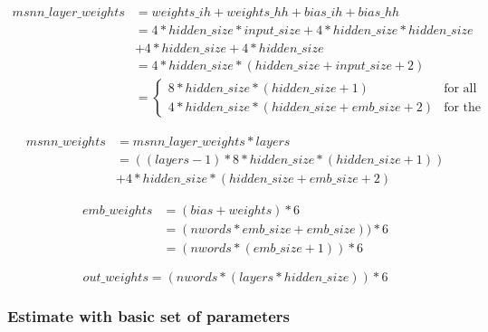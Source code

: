 \begin{equation}
\begin{aligned}
msnn\_layer\_weights &= weights\_ih + weights\_hh + bias\_ih + bias\_hh \\
                     &= 4 * hidden\_size * input\_size + 4 * hidden\_size * hidden\_size \\
                     & + 4 * hidden\_size + 4 * hidden\_size \\
                     &= 4 * hidden\_size * (hidden\_size + input\_size + 2) \\
                     &= \begin{cases}
                        8 * hidden\_size * (hidden\_size + 1) &\text{for all layers exept the first one} \\
                        4 * hidden\_size * (hidden\_size + emb\_size + 2)  &\text{for the first layer}
                        \end{cases}
\end{aligned}
\end{equation}

\begin{equation}
\begin{aligned}
msnn\_weights &= msnn\_layer\_weights * layers \\
              &= ((layers - 1) * 8 * hidden\_size * (hidden\_size + 1))\\
              & + 4 * hidden\_size * (hidden\_size + emb\_size + 2)
\end{aligned}
\end{equation}

\begin{equation}
\begin{aligned}
emb\_weights &= (bias + weights) * 6 \\
            &= (nwords * emb\_size + emb\_size))* 6 \\
            &= (nwords * (emb\_size + 1)) * 6
\end{aligned}
\end{equation}

\begin{equation}
out\_weights = (nwords * (layers * hidden\_size)) * 6
\end{equation}

\newpage
\subsubsection{Estimate with basic set of parameters}

